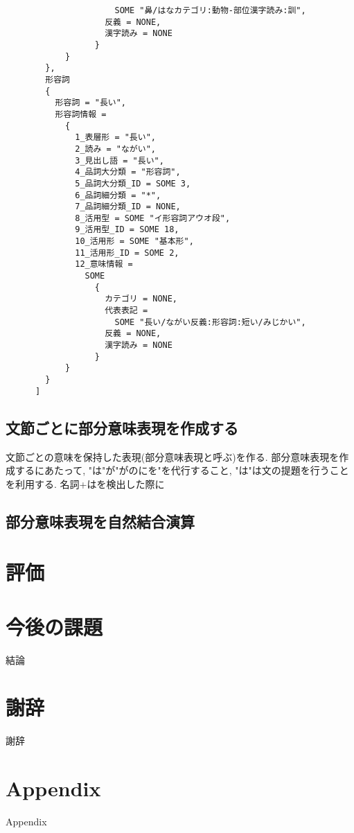 \documentclass{jreport}
\begin{document}
\begin{Verbatim}
                      SOME "鼻/はなカテゴリ:動物-部位漢字読み:訓",
                    反義 = NONE,
                    漢字読み = NONE
                  }
            }
        },
        形容詞
        {
          形容詞 = "長い",
          形容詞情報 =
            {
              1_表層形 = "長い",
              2_読み = "ながい",
              3_見出し語 = "長い",
              4_品詞大分類 = "形容詞",
              5_品詞大分類_ID = SOME 3,
              6_品詞細分類 = "*",
              7_品詞細分類_ID = NONE,
              8_活用型 = SOME "イ形容詞アウオ段",
              9_活用型_ID = SOME 18,
              10_活用形 = SOME "基本形",
              11_活用形_ID = SOME 2,
              12_意味情報 =
                SOME
                  {
                    カテゴリ = NONE,
                    代表表記 =
                      SOME "長い/ながい反義:形容詞:短い/みじかい",
                    反義 = NONE,
                    漢字読み = NONE
                  }
            }
        }
      ]
\end{Verbatim}


\section{文節ごとに部分意味表現を作成する}
文節ごとの意味を保持した表現(部分意味表現と呼ぶ)を作る. 部分意味表現を作成するにあたって, 
"は"が"がのにを"を代行すること, "は"は文の提題を行うことを利用する. 名詞+はを検出した際に

\section{部分意味表現を自然結合演算}


\chapter{評価}

\chapter{今後の課題}
結論

\chapter*{謝辞}
{謝辞}

\appendix
\chapter{Appendix}
Appendix
\end{document}
